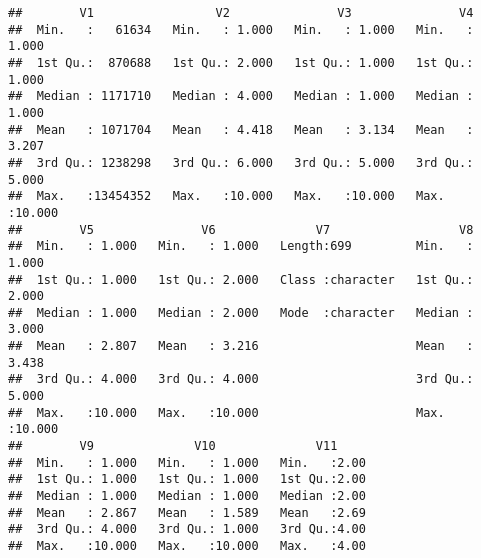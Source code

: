 \documentclass[
]{article}
\newenvironment{Shaded}{\begin{snugshade}}{\end{snugshade}}
\newcommand{\DecValTok}[1]{\textcolor[rgb]{0.00,0.00,0.81}{#1}}
\newcommand{\FunctionTok}[1]{\textcolor[rgb]{0.00,0.00,0.00}{#1}}
\newcommand{\NormalTok}[1]{#1}
\newcommand{\OtherTok}[1]{\textcolor[rgb]{0.56,0.35,0.01}{#1}}
\newcommand{\SpecialCharTok}[1]{\textcolor[rgb]{0.00,0.00,0.00}{#1}}
\newcommand{\StringTok}[1]{\textcolor[rgb]{0.31,0.60,0.02}{#1}}
\begin{document}
\begin{verbatim}
##        V1                 V2               V3               V4        
##  Min.   :   61634   Min.   : 1.000   Min.   : 1.000   Min.   : 1.000  
##  1st Qu.:  870688   1st Qu.: 2.000   1st Qu.: 1.000   1st Qu.: 1.000  
##  Median : 1171710   Median : 4.000   Median : 1.000   Median : 1.000  
##  Mean   : 1071704   Mean   : 4.418   Mean   : 3.134   Mean   : 3.207  
##  3rd Qu.: 1238298   3rd Qu.: 6.000   3rd Qu.: 5.000   3rd Qu.: 5.000  
##  Max.   :13454352   Max.   :10.000   Max.   :10.000   Max.   :10.000  
##        V5               V6              V7                  V8        
##  Min.   : 1.000   Min.   : 1.000   Length:699         Min.   : 1.000  
##  1st Qu.: 1.000   1st Qu.: 2.000   Class :character   1st Qu.: 2.000  
##  Median : 1.000   Median : 2.000   Mode  :character   Median : 3.000  
##  Mean   : 2.807   Mean   : 3.216                      Mean   : 3.438  
##  3rd Qu.: 4.000   3rd Qu.: 4.000                      3rd Qu.: 5.000  
##  Max.   :10.000   Max.   :10.000                      Max.   :10.000  
##        V9              V10              V11      
##  Min.   : 1.000   Min.   : 1.000   Min.   :2.00  
##  1st Qu.: 1.000   1st Qu.: 1.000   1st Qu.:2.00  
##  Median : 1.000   Median : 1.000   Median :2.00  
##  Mean   : 2.867   Mean   : 1.589   Mean   :2.69  
##  3rd Qu.: 4.000   3rd Qu.: 1.000   3rd Qu.:4.00  
##  Max.   :10.000   Max.   :10.000   Max.   :4.00
\end{verbatim}

\begin{Shaded}
\end{Shaded}
\end{document}
